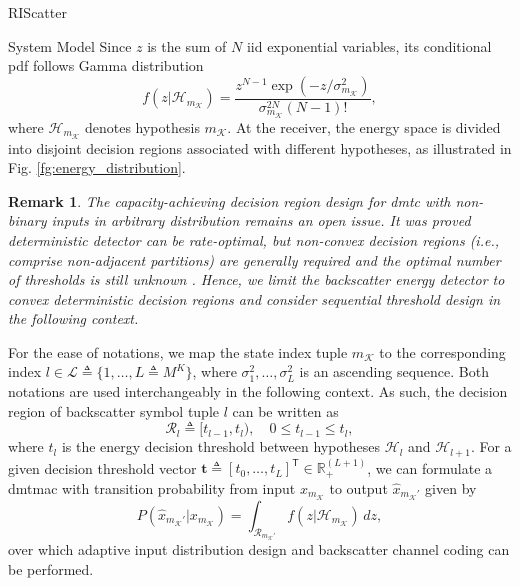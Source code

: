 \documentclass[journal]{IEEEtran}
\newtheorem{remark}{Remark}
\begin{document}
\begin{section}{RIScatter}
\begin{subsection}{System Model}
		Since $z$ is the sum of $N$ \gls{iid} exponential variables, its conditional \gls{pdf} follows Gamma distribution
		\begin{equation}
			f(z|\mathcal{H}_{m_{\mathcal{K}}}) = \frac{z^{N-1} \exp(-z/\sigma_{m_{\mathcal{K}}}^2)}{\sigma_{m_{\mathcal{K}}}^{2N} (N-1)!},
			\label{eq:energy_distribution}
		\end{equation}
		where $\mathcal{H}_{m_{\mathcal{K}}}$ denotes hypothesis $m_{\mathcal{K}}$.
		At the receiver, the energy space is divided into disjoint decision regions associated with different hypotheses, as illustrated in Fig. \ref{fg:energy_distribution}.
		\begin{remark}
			The capacity-achieving decision region design for \gls{dmtc} with non-binary inputs in arbitrary distribution remains an open issue.
			It was proved deterministic detector can be rate-optimal, but non-convex decision regions (i.e., comprise non-adjacent partitions) are generally required and the optimal number of thresholds is still unknown \cite{Nguyen2018,Nguyen2021}.
			Hence, we limit the backscatter energy detector to convex deterministic decision regions and consider sequential threshold design in the following context.
		\end{remark}

		For the ease of notations, we map the state index tuple $m_{\mathcal{K}}$ to the corresponding index $l \in \mathcal{L} \triangleq \{1,\ldots,L \triangleq M^K\}$, where $\sigma_1^2,\ldots,\sigma_L^2$ is an ascending sequence.
		Both notations are used interchangeably in the following context.
		As such, the decision region of backscatter symbol tuple $l$ can be written as
		\begin{equation}
			\mathcal{R}_{l} \triangleq [t_{l-1},t_l), \quad 0 \le t_{l-1} \le t_l,
		\end{equation}
		where $t_l$ is the energy decision threshold between hypotheses $\mathcal{H}_{l}$ and $\mathcal{H}_{l+1}$.
		For a given decision threshold vector $\boldsymbol{t} \triangleq [t_0,\ldots,t_L]^\mathsf{T} \in \mathbb{R}_+^{(L+1)}$, we can formulate a \gls{dmtmac} with transition probability from input $x_{m_{\mathcal{K}}}$ to output $\hat{x}_{m_{\mathcal{K}}'}$ given by
		\begin{equation}
			P(\hat{x}_{m_{\mathcal{K}}'}|x_{m_{\mathcal{K}}}) = \int_{\mathcal{R}_{m_{\mathcal{K}}'}} f(z|\mathcal{H}_{m_{\mathcal{K}}}) \, d z,
			\label{eq:dmtmac}
		\end{equation}
		over which adaptive input distribution design and backscatter channel coding can be performed.
		\label{st:system_model}
	\end{subsection}


\end{section}
\end{document}
